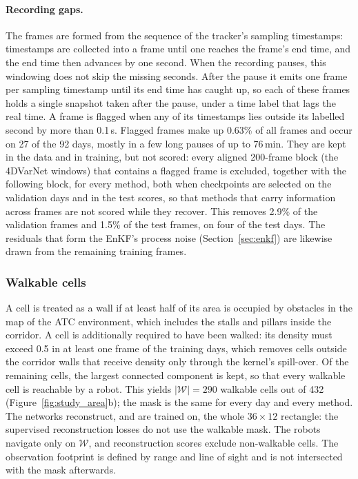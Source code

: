 \documentclass[english, 12pt, a4paper, elec, utf8, a-2b, online]{aaltothesis}
\begin{document}
\paragraph{Recording gaps.}
The frames are formed from the sequence of the tracker's sampling timestamps:
timestamps are collected into a frame until one reaches the frame's end time,
and the end time then advances by one second. When the recording pauses, this
windowing does not skip the missing seconds. After the pause it emits one frame
per sampling timestamp until its end time has caught up, so each of these frames
holds a single snapshot taken after the pause, under a time label that lags the
real time. A frame is flagged when any of its timestamps lies outside its
labelled second by more than 0.1\,s. Flagged frames make up 0.63\% of all
frames and occur on 27 of the 92 days, mostly in a few long pauses of up to
76\,min. They are kept in the data and in training, but not scored: every
aligned 200-frame block (the 4DVarNet windows) that contains a flagged frame is
excluded, together with the following block, for every method, both when
checkpoints are selected on the validation days and in the test scores, so
that methods that carry information across frames are not scored while they
recover. This removes 2.9\% of the validation frames and 1.5\% of the test
frames, on four of the test days. The residuals that form the EnKF's process
noise (Section~\ref{sec:enkf}) are likewise drawn from the remaining training
frames.

\subsubsection{Walkable cells}
A cell is treated as a wall if at least half of its area is occupied by
obstacles in the map of the ATC environment, which includes the stalls and
pillars inside the corridor. A cell is additionally required to have been
walked: its density must exceed 0.5 in at least one frame of the training days,
which removes cells outside the corridor walls that receive density only
through the kernel's spill-over. Of the remaining cells, the largest connected
component is kept, so that every walkable cell is reachable by a robot. This
yields $|\mathcal{W}| = 290$ walkable cells out of 432 (Figure~\ref{fig:study_area}b);
the mask is the same for every day and every method. The networks reconstruct,
and are trained on, the whole $36 \times 12$ rectangle: the supervised
reconstruction losses do not use the walkable mask. The robots navigate only
on $\mathcal{W}$, and reconstruction scores exclude non-walkable cells.
The observation footprint is
defined by range and line of sight and is not intersected with the mask
afterwards.
\end{document}
